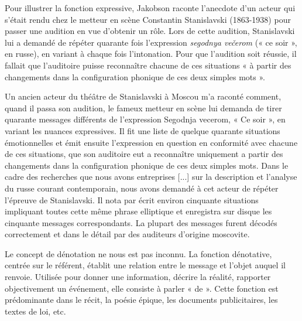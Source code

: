 \begin{bbcomplement}{}
Pour illustrer la fonction expressive, Jakobson raconte l’anecdote d’un acteur qui s’était rendu chez le metteur en scène Constantin Stanislavski (1863-1938) pour passer une audition en vue d’obtenir un rôle. Lors de cette audition, Stanislavski lui a demandé de répéter quarante fois l’expression \textit{segodnya večerom} (« ce soir », en russe), en variant à chaque fois l’intonation. Pour que l’audition soit réussie, il fallait que l’auditoire puisse reconnaître chacune de ces situations « à partir des changements dans la configuration phonique de ces deux simples mots ».

Un ancien acteur du théâtre de Stanislavski à Moscou m’a raconté comment, quand il passa son audition, le fameux metteur en scène lui demanda de tirer quarante messages différents de l’expression Segodnja vecerom, « Ce soir », en variant les nuances expressives. Il fit une liste de quelque quarante situations émotionnelles et émit ensuite l’expression en question en conformité avec chacune de ces situations, que son auditoire eut a reconnaître uniquement a partir des changements dans la configuration phonique de ces deux simples mots. Dans le cadre des recherches que nous avons entreprises [...] sur la description et l’analyse du russe courant contemporain, nous avons demandé à cet acteur de répéter l’épreuve de Stanislavski. Il nota par écrit environ cinquante situations impliquant toutes cette même phrase elliptique et enregistra sur disque les cinquante messages correspondants. La plupart des messages furent décodés correctement et dans le détail par des auditeurs d’origine moscovite.
\end{bbcomplement}

Le concept de dénotation ne nous est pas inconnu. La fonction dénotative, centrée sur le référent, établit une relation entre le message et l’objet auquel il renvoie. Utilisée pour donner une information, décrire la réalité, rapporter objectivement un événement, elle consiste à parler « de ». Cette fonction est prédominante dans le récit, la poésie épique, les documents publicitaires, les textes de loi, etc.


